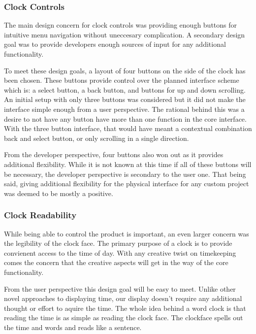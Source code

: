 \documentclass[10pt,draftclsnofoot,onecolumn]{IEEEtran}
\begin{document}
\subsubsection{Clock Controls} 

The main design concern for clock controls was providing enough buttons for intuitive menu navigation without uneccesary complication.
A secondary design goal was to provide developers enough sources of input for any additional functionality.

To meet these design goals, a layout of four buttons on the side of the clock has been chosen. 
These buttons provide control over the planned interface scheme which is: a select button, a back button, and buttons for up and down scrolling.
An initial setup with only three buttons was considered but it did not make the interface simple enough from a user perspective.
The rational behind this was a desire to not have any button have more than one function in the core interface.
With the three button interface, that would have meant a contextual combination back and select button, or only scrolling in a single direction.

From the developer perspective, four buttons also won out as it provides additional flexibility.
While it is not known at this time if all of these buttons will be necessary, the developer perspective is secondary to the user one.
That being said, giving additional flexibility for the physical interface for any custom project was deemed to be mostly a positive.

\subsubsection{Clock Readability}

While being able to control the product is important, an even larger concern was the legibility of the clock face.
The primary purpose of a clock is to provide convienent access to the time of day.
With any creative twist on timekeeping comes the concern that the creative aspects will get in the way of the core functionality.

From the user perspective this design goal will be easy to meet.
Unlike other novel approaches to displaying time, our display doesn't require any additional thought or effort to aquire the time.
The whole idea behind a word clock is that reading the time is as simple as reading the clock face.
The clockface spells out the time and words and reads like a sentence.
\end{document}
